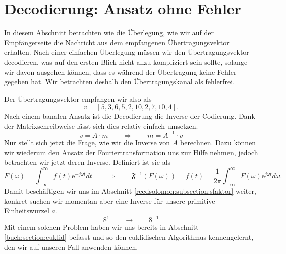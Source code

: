 %
%
%
\section{Decodierung: Ansatz ohne Fehler
\label{reedsolomon:section:decohnefehler}}

In diesem Abschnitt betrachten wie die Überlegung, wie wir auf der Empfängerseite die Nachricht aus dem empfangenen Übertragungsvektor erhalten. Nach einer einfachen Überlegung müssen wir den Übertragungsvektor decodieren, was auf den ersten Blick nicht allzu kompliziert sein sollte, solange wir davon ausgehen können, dass es während der Übertragung keine Fehler gegeben hat. Wir betrachten deshalb den Übertragungskanal als fehlerfrei.

Der Übertragungsvektor empfangen wir also als
\[
v = [5,3,6,5,2,10,2,7,10,4].
\]
Nach einem banalen Ansatz ist die Decodierung die Inverse der Codierung. Dank der Matrixschreibweise lässt sich dies relativ einfach umsetzen.
\[
v = A \cdot m \qquad \Rightarrow \qquad m = A^{-1} \cdot v
\]
Nur stellt sich jetzt die Frage, wie wir die Inverse von $A$ berechnen.
Dazu können wir wiederum den Ansatz der Fouriertransformation uns zur Hilfe nehmen,
jedoch betrachten wir jetzt deren Inverse.
Definiert ist sie als
\[
F(\omega) = \int_{-\infty}^{\infty} f(t) \mathrm{e}^{-j\omega t} dt \qquad \Rightarrow \qquad \mathfrak{F}^{-1}(F(\omega)) = f(t) = \frac{1}{2 \pi} \int_{-\infty}^{\infty} F(\omega) \mathrm{e}^{j \omega t} d\omega.
\]
Damit beschäftigen wir uns im Abschnitt \ref{reedsolomon:subsection:sfaktor} weiter, konkret suchen wir momentan aber eine Inverse für unsere primitive Einheitswurzel $a$. 
\[
8^1 \qquad \rightarrow \qquad 8^{-1}
\]
Mit einem solchen Problem haben wir uns bereits in Abschnitt \ref{buch:section:euklid} befasst und so den euklidischen Algorithmus kennengelernt, den wir auf unseren Fall anwenden können.


